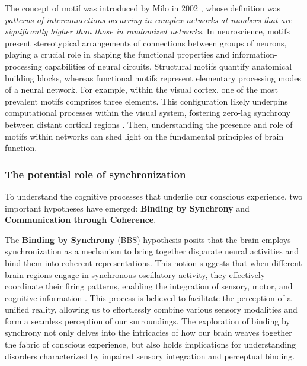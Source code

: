 \documentclass[../main.tex]{subfiles}
\begin{document}
The concept of motif was introduced by Milo in 2002 \citep{milo2002network}, whose definition was \textit{patterns of interconnections occurring in complex networks at numbers that are significantly higher than those in randomized networks}.
In neuroscience, motifs present stereotypical arrangements of connections between groups of neurons, playing a crucial role in shaping the functional properties and information-processing capabilities of neural circuits.
Structural motifs quantify anatomical building blocks, whereas functional motifs represent elementary processing modes of a neural network.
For example, within the visual cortex, one of the most prevalent motifs comprises three elements.
This configuration likely underpins computational processes within the visual system, fostering zero-lag synchrony between distant cortical regions \citep{sporns_motifs_2004}.
Then, understanding the presence and role of motifs within networks can shed light on the fundamental principles of brain function.
\clearpage
\subsubsection{The potential role of synchronization}
To understand the cognitive processes that underlie our conscious experience, two important hypotheses have emerged: \textbf{Binding by Synchrony} and \textbf{Communication through Coherence}.

The \textbf{Binding by Synchrony} (BBS) hypothesis posits that the brain employs synchronization as a mechanism to bring together disparate neural activities and bind them into coherent representations.
This notion suggests that when different brain regions engage in synchronous oscillatory activity, they effectively coordinate their firing patterns, enabling the integration of sensory, motor, and cognitive information \citep{singer_binding_2007}.
This process is believed to facilitate the perception of a unified reality, allowing us to effortlessly combine various sensory modalities and form a seamless perception of our surroundings.
The exploration of binding by synchrony not only delves into the intricacies of how our brain weaves together the fabric of conscious experience, but also holds implications for understanding disorders characterized by impaired sensory integration and perceptual binding.
\end{document}
